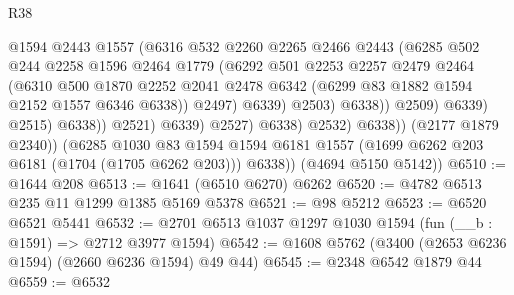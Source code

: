 \begin{lexlean}{R38}
\begin{coremodule}
                                      @1594
                                      @2443
                                      @1557
                                      (@6316
                                        @532
                                        @2260
                                        @2265
                                        @2466
                                        @2443
                                        (@6285
                                          @502
                                          @244
                                          @2258
                                          @1596
                                          @2464
                                          @1779
                                          (@6292
                                            @501
                                            @2253
                                            @2257
                                            @2479
                                            @2464
                                            (@6310
                                              @500
                                              @1870
                                              @2252
                                              @2041
                                              @2478
                                              @6342
                                              (@6299 @83 @1882 @1594 @2152 @1557 @6346 @6338))
                                            @2497)
                                          @6339)
                                        @2503)
                                      @6338))
                                  @2509)
                                @6339)
                              @2515)
                            @6338))
                        @2521)
                      @6339)
                    @2527)
                  @6338)
                @2532)
              @6338))
          (@2177 @1879 @2340))
        (@6285
          @1030
          @83
          @1594
          @1594
          @6181
          @1557
          (@1699 @6262 @203 @6181 (@1704 (@1705 @6262 @203)))
          @6338))
      (@4694 @5150 @5142))
@6510 := @1644 @208
@6513 := @1641 (@6510 @6270) @6262
@6520 := @4782 @6513 @235 @11 @1299 @1385 @5169 @5378
@6521 := @98 @5212
@6523 := @6520 @6521 @5441
@6532 := @2701 @6513 @1037 @1297 @1030 @1594 (fun (__b : @1591) => @2712 @3977 @1594)
@6542 := @1608 @5762 (@3400 (@2653 @6236 @1594) (@2660 @6236 @1594) @49 @44)
@6545 := @2348 @6542 @1879 @44
@6559 := @6532

\end{coremodule}
\end{lexlean}
